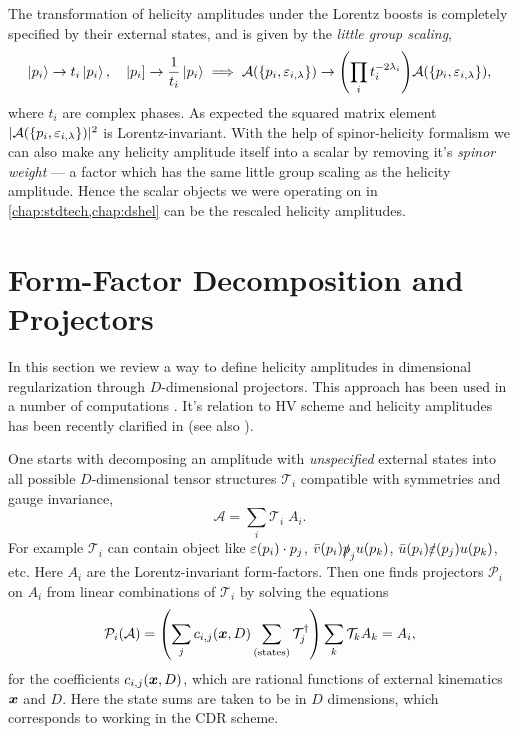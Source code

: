 The transformation of helicity amplitudes under the Lorentz boosts is completely specified by their 
external states, and is given by the \emph{little group scaling},
\begin{equation}
  \ket{p_i} \to t_i \ket{p_i}, \quad  \left\vert p_i \right] \to \frac{1}{t_i} \ket{p_i} \implies \mathcal{A}(\{p_i,\varepsilon_{i,\lambda}\}) \to  \qty(\prod_i t_i^{-2\lambda_i}) \mathcal{A}(\{p_i,\varepsilon_{i,\lambda}\}),
\end{equation}
where $t_i$ are complex phases.
As expected the squared matrix element $\vert \mathcal{A}(\{p_i,\varepsilon_{i,\lambda}\}) \vert^2$ is Lorentz-invariant.
With the help of spinor-helicity formalism we can also make any helicity amplitude itself into a scalar
by removing it's \emph{spinor weight} --- a factor which has the same little group scaling
as the helicity amplitude.
Hence the scalar objects we were operating on in \cref{chap:stdtech,chap:dshel} can be the rescaled helicity amplitudes.




\section{Form-Factor Decomposition and Projectors}
\label{sec:helampl_projectors}

In this section we review a way to define helicity amplitudes in dimensional regularization through $D$-dimensional projectors.
This approach has been used in a number of computations \cite{Garland:2002ak, Moch:2002hm, Glover:2003cm, Glover:2004si,Gehrmann:2009vu,Gehrmann:2011aa}.
It's relation to HV scheme and helicity amplitudes has been recently clarified in \cite{Peraro:2019cjj} (see also \cite{Chen:2019wyb}).

One starts with decomposing an amplitude with \emph{unspecified} external states into all possible $D$-dimensional tensor structures $\mathcal{T}_i$ compatible
with symmetries and gauge invariance,
\begin{equation}
  \mathcal{A}  = \sum_{i} \mathcal{T}_i\;A_i.
\end{equation}
For example $\mathcal{T}_i$ can contain object like $\sp(\varepsilon(p_i),p_j)$, $\bar{v}(p_i) \slashed{p}_j u(p_k) $, $\bar{u}(p_i) \slashed{\varepsilon}(p_j) u(p_k)$, etc.
Here $A_i$ are the Lorentz-invariant form-factors.
Then one finds projectors $\mathcal{P}_i$ on $A_i$ from linear combinations of $\mathcal{T}_i$ by solving the equations
\begin{equation} \label{eq:cdr_projectors}
  \mathcal{P}_i (\mathcal{A}) = \qty(\sum_j c_{i,j}(\vb*{x},D) \sum_\text{(states)} \mathcal{T}^{\dagger}_j) \sum_{k} \mathcal{T}_k A_k = A_i, 
\end{equation}
for the coefficients $c_{i,j}(\vb*{x},D)$, which are rational functions of external kinematics $\vb*{x}$ and $D$.
Here the state sums are taken to be in $D$ dimensions, which corresponds to working in the CDR scheme.

